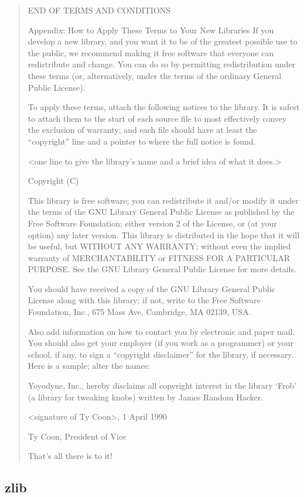 \documentclass[
]{book}
\theoremstyle{definition}
\theoremstyle{definition}
\theoremstyle{definition}
\theoremstyle{definition}
\theoremstyle{remark}
\begin{document}
\begin{quote}
END OF TERMS AND CONDITIONS

Appendix: How to Apply These Terms to Your New Libraries
If you develop a new library, and you want it to be of the
greatest possible use to the public, we recommend making it free
software that everyone can redistribute and change. You can do
so by permitting redistribution under these terms (or,
alternatively, under the terms of the ordinary General Public
License).

To apply these terms, attach the following notices to the
library. It is safest to attach them to the start of each
source file to most effectively convey the exclusion of
warranty; and each file should have at least the ``copyright''
line and a pointer to where the full notice is found.

\textless one line to give the library's name and a brief idea of what it does.\textgreater{}

Copyright (C)

This library is free software; you can redistribute it and/or
modify it under the terms of the GNU Library General Public
License as published by the Free Software Foundation; either
version 2 of the License, or (at your option) any later version.
This library is distributed in the hope that it will be useful,
but WITHOUT ANY WARRANTY; without even the implied warranty of
MERCHANTABILITY or FITNESS FOR A PARTICULAR PURPOSE. See the GNU
Library General Public License for more details.

You should have received a copy of the GNU Library General Public
License along with this library; if not, write to the Free
Software Foundation, Inc., 675 Mass Ave, Cambridge, MA 02139, USA.

Also add information on how to contact you by electronic and paper mail.
You should also get your employer (if you work as a programmer) or your
school, if any, to sign a ``copyright disclaimer'' for the library, if
necessary. Here is a sample; alter the names:

Yoyodyne, Inc., hereby disclaims all copyright interest in the
library `Frob' (a library for tweaking knobs) written by James Random Hacker.

\textless signature of Ty Coon\textgreater, 1 April 1990

Ty Coon, President of Vice

That's all there is to it!
\end{quote}

\hypertarget{zlib}{%
\subsection*{zlib}\label{zlib}}
\end{document}
